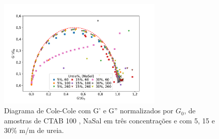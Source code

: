 		\begin{figure}[h]
			\centering
			\includegraphics[width=0.7\textwidth]{imagens/reologia/colecole_ureia}
			\caption{Diagrama de Cole-Cole com G' e G'' normalizados por \(G_0\), de amostras de CTAB 100 \mM{}, NaSal em três concentrações e com 5, 15 e 30\% m/m de ureia.}
			\label{fig:colecole_ureia}
		\end{figure}





\FloatBarrier
